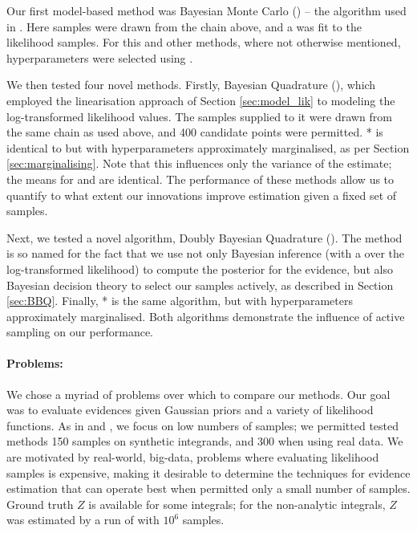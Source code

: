 \documentclass{article} %
\begin{document}
Our first model-based method was Bayesian Monte Carlo () -- the algorithm used in \cite{BZMonteCarlo}. Here samples were drawn from the  chain above, and a \gpb was fit to the likelihood samples. For this and other methods, where not otherwise mentioned, \gpb hyperparameters were selected using . 

We then tested four novel methods. Firstly, Bayesian Quadrature (), which employed the linearisation approach of Section \ref{sec:model_lik} to modeling the log-transformed likelihood values. The samples supplied to it were drawn from the same  chain as used above, and 400 candidate points were permitted. * is identical to  but with hyperparameters approximately marginalised, as per Section \ref{sec:marginalising}. Note that this influences only the variance of the estimate; the means for  and  are identical. The performance of these methods allow us to quantify to what extent our innovations improve estimation given a fixed set of samples. 

Next, we tested a novel algorithm, Doubly Bayesian Quadrature (). The method is so named for the fact that we use not only Bayesian inference (with a \gpb over the log-transformed likelihood) to compute the posterior for the evidence, but also Bayesian decision theory to select our samples actively, as described in Section \ref{sec:BBQ}. %
 Finally, * is the same algorithm, but with hyperparameters approximately marginalised. Both algorithms demonstrate the influence of active sampling on our performance. 

\paragraph{Problems:}
We chose a myriad of problems over which to compare our methods. Our goal was to evaluate evidences given Gaussian priors and a variety of likelihood functions. As in \cite{BZMonteCarlo} and \cite{BQR}, we focus on low numbers of samples; we permitted tested methods 150 samples on synthetic integrands, and 300 when using real data. We are motivated by real-world, big-data, problems where evaluating likelihood samples is expensive, making it desirable to determine the techniques for evidence estimation that can operate best when permitted only a small number of samples. Ground truth $Z$ is available for some integrals; for the non-analytic integrals, $Z$ was estimated by a run of  with $10^6$ samples.
\end{document}
